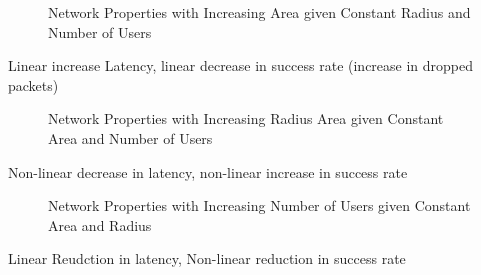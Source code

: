 \begin{figure}
    \caption{Network Properties with Increasing Area given Constant Radius and Number of Users}
    \label{fig:vararea}
\end{figure}
Linear increase Latency, linear decrease in success rate (increase in dropped packets)

\begin{figure}
    \caption{Network Properties with Increasing Radius Area given Constant Area and Number of Users}
    \label{fig:varradius}
\end{figure}
Non-linear decrease in latency, non-linear increase in success rate

\begin{figure}
    \caption{Network Properties with Increasing Number of Users given Constant Area and Radius}
    \label{fig:varusers}
\end{figure}
Linear Reudction in latency, Non-linear reduction in success rate
